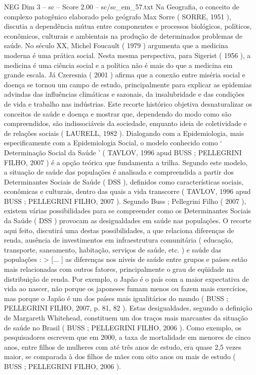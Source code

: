\begin{textsample}{NEG Dim 3 – sc – Score 2.00 – sc/sc\_em\_57.txt}
Na Geografia, o conceito de complexo patogênico elaborado pelo geógrafo Max Sorre ( SORRE, 1951 ), discutia a dependência mútua entre componentes e processos biológicos, políticos, econômicos, culturais e ambientais na produção de determinados problemas de saúde.
No século XX, Michel Foucault ( 1979 ) argumenta que a medicina moderna é uma prática social.
Nesta mesma perspectiva, para Sigerist ( 1956 ), a medicina é uma ciência social e a política não é mais do que a medicina em grande escala.
Já Czeresnia ( 2001 ) afirma que a conexão entre miséria social e doença se tornou um campo de estudo, principalmente para explicar as epidemias advindas das influências climáticas e sazonais, da insalubridade e das condições de vida e trabalho nas indústrias.
Este recorte histórico objetiva desnaturalizar os conceitos de saúde e doença e mostrar que, dependendo do modo como são compreendidos, são indissociáveis da sociedade, enquanto ideia de coletividade e de relações sociais ( LAURELL, 1982 ).
Dialogando com a Epidemiologia, mais especificamente com a Epidemiologia Social, o modelo conhecido como ‘ Determinação Social da Saúde ’ ( TAVLOV, 1996 apud BUSS ; PELLEGRINI FILHO, 2007 ) é a opção teórica que fundamenta a trilha.
Segundo este modelo, a situação de saúde das populações é analisada e compreendida a partir dos Determinantes Sociais de Saúde ( DSS ), definidos como características sociais, econômicas e culturais, dentro das quais a vida transcorre ( TAVLOV, 1996 apud BUSS ; PELLEGRINI FILHO, 2007 ).
Segundo Buss ; Pellegrini Filho ( 2007 ), existem várias possibilidades para se compreender como os Determinantes Sociais da Saúde ( DSS ) provocam as desigualdades em saúde nas populações.
O recorte aqui feito, discutirá uma destas possibilidades, a que relaciona diferenças de renda, ausência de investimentos em infraestrutura comunitária ( educação, transporte, saneamento, habitação, serviços de saúde, etc. ) e saúde das populações : > [... ] as diferenças nos níveis de saúde entre grupos e países estão mais relacionadas com outros fatores, principalmente o grau de eqüidade na distribuição de renda.
Por exemplo, o Japão é o país com a maior expectativa de vida ao nascer, não porque os japoneses fumam menos ou fazem mais exercícios, mas porque o Japão é um dos países mais igualitários do mundo ( BUSS ; PELLEGRINI FILHO, 2007, p. 81, 82 ).
Estas desigualdades, segundo a definição de Margareth Whitehead, constituem um dos traços mais marcantes da situação de saúde no Brasil ( BUSS ; PELLEGRINI FILHO, 2006 ).
Como exemplo, os pesquisadores escrevem que em 2000, a taxa de mortalidade em menores de cinco anos, entre filhos de mulheres com até três anos de estudo, era quase 2,5 vezes maior, se comparada à dos filhos de mães com oito anos ou mais de estudo ( BUSS ; PELLEGRINI FILHO, 2006 ).

\end{textsample}
